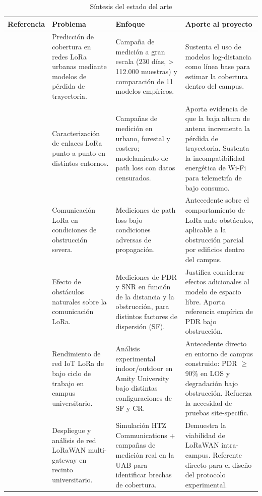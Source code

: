 \documentclass[12pt,oneside,openany,spanish,oldfontcommands]{memoir}
\begin{document}
\begin{table}[H]
\centering
\caption{Síntesis del estado del arte}
\label{tab:estado-arte}
\scriptsize
\begin{tabularx}{\textwidth}{p{2.5cm} X X X}
\toprule
\textbf{Referencia} & \textbf{Problema} & \textbf{Enfoque} & \textbf{Aporte al proyecto}\\
\midrule
\textcite{rademacher2021}
&
Predicción de cobertura en redes LoRa urbanas mediante modelos de pérdida de trayectoria.
&
Campaña de medición a gran escala (230 días, > 112.000 muestras) y comparación de 11 modelos empíricos.
&
Sustenta el uso de modelos log-distancia como línea base para estimar la cobertura dentro del campus.
\\
\midrule
\textcite{callebaut2020}
&
Caracterización de enlaces LoRa punto a punto en distintos entornos.
&
Campañas de medición en urbano, forestal y costero; modelamiento de path loss con datos censurados.
&
Aporta evidencia de que la baja altura de antena incrementa la pérdida de trayectoria. Sustenta la incompatibilidad energética de Wi-Fi para telemetría de bajo consumo.
\\
\midrule
\textcite{bianco2021}
&
Comunicación LoRa en condiciones de obstrucción severa.
&
Mediciones de path loss bajo condiciones adversas de propagación.
&
Antecedente sobre el comportamiento de LoRa ante obstáculos, aplicable a la obstrucción parcial por edificios dentro del campus.
\\
\midrule
\textcite{ahmed2024vegetacion}
&
Efecto de obstáculos naturales sobre la comunicación LoRa.
&
Mediciones de PDR y SNR en función de la distancia y la obstrucción, para distintos factores de dispersión (SF).
&
Justifica considerar efectos adicionales al modelo de espacio libre. Aporta referencia empírica de PDR bajo obstrucción.
\\
\midrule
\textcite{kaur2024campus}
&
Rendimiento de red IoT LoRa de bajo ciclo de trabajo en campus universitario.
&
Análisis experimental indoor/outdoor en Amity University bajo distintas configuraciones de SF y CR.
&
Antecedente directo en entorno de campus construido: PDR $\geq$ 90\% en LOS y degradación bajo obstrucción. Refuerza la necesidad de pruebas site-specific.
\\
\midrule
\textcite{barrachina2023campus}
&
Despliegue y análisis de red LoRaWAN multi-gateway en recinto universitario.
&
Simulación HTZ Communications + campañas de medición real en la UAB para identificar brechas de cobertura.
&
Demuestra la viabilidad de LoRaWAN intra-campus. Referente directo para el diseño del protocolo experimental.
\\
\bottomrule
\end{tabularx}
\end{table}
\end{document}
